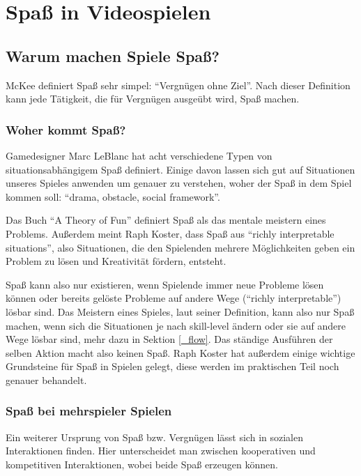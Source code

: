 \chapter{Spaß in Videospielen}

\section{Warum machen Spiele Spaß?}

McKee definiert Spaß sehr simpel: "`Vergnügen ohne Ziel"'. Nach dieser Definition kann jede Tätigkeit, die für Vergnügen ausgeübt wird, Spaß machen\cite{_fun}.

\subsection{Woher kommt Spaß?}

Gamedesigner Marc LeBlanc hat acht verschiedene Typen von situationsabhängigem Spaß definiert. Einige davon lassen sich gut auf Situationen unseres Spieles anwenden um genauer zu verstehen, woher der Spaß in dem Spiel kommen soll: "`drama, obstacle, social framework"'. 

Das Buch "`A Theory of Fun"'\cite{_theory_of_fun} definiert Spaß als das mentale meistern eines Problems\cite[S. 71]{_theory_of_fun}. Außerdem meint Raph Koster, dass Spaß aus "`richly interpretable situations"'\cite[S. 40]{_theory_of_fun}, also Situationen, die den Spielenden mehrere Möglichkeiten geben ein Problem zu lösen und Kreativität fördern, entsteht. 

Spaß kann also nur existieren, wenn Spielende immer neue Probleme lösen können oder bereits gelöste Probleme auf andere Wege ("`richly interpretable"') lösbar sind. Das Meistern eines Spieles, laut seiner Definition, kann also nur Spaß machen, wenn sich die Situationen je nach skill-level ändern oder sie auf andere Wege lösbar sind, mehr dazu in Sektion \ref{_flow}. Das ständige Ausführen der selben Aktion macht also keinen Spaß. Raph Koster hat außerdem einige wichtige Grundsteine für Spaß in Spielen gelegt, diese werden im praktischen Teil noch genauer behandelt.

\subsection{Spaß bei mehrspieler Spielen}

Ein weiterer Ursprung von Spaß bzw. Vergnügen lässt sich in sozialen Interaktionen finden\cite[S. 72]{_theory_of_fun}. Hier unterscheidet man zwischen kooperativen und kompetitiven Interaktionen, wobei beide Spaß erzeugen können. 

